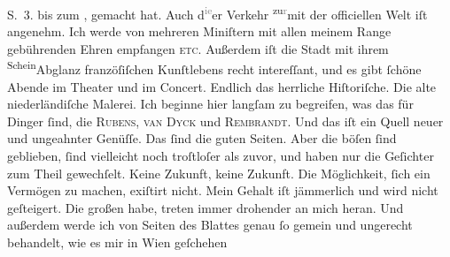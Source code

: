 \begin{ledgroupsized}[t]{13cm}
{{{                     S. 3.}}}\label{K_L02669-8h} bis zum \label{K_L02669-666v}\label{K_L02669-666h}, gemacht
               hat. Auch d\substVorne{}\textsuperscript{\textcolor{gray}{ie}}\substDazwischen{}er\substHinten{} Verkehr \substVorne{}\textsuperscript{zu\textcolor{gray}{r}}\substDazwischen{}mit der\substHinten{} officiellen Welt iſt angenehm. Ich werde von mehreren Miniſtern mit allen
               meinem Range gebührenden Ehren empfangen \textsc{etc.} Außerdem iſt
               die Stadt mit ihrem \substVorne{}\textsuperscript{Schein}{\allowbreak}\substDazwischen{}Abglanz\substHinten{} franzöſiſchen Kunſtlebens recht intereſſant, und es gibt ſchöne Abende im
               Theater und im Concert. Endlich das herrliche Hiſtoriſche. Die alte niederländiſche Malerei. Ich beginne hier langſam zu
               begreifen, was das für Dinger ſind, die \textsc{Rubens}, \textsc{van Dyck} und \textsc{Rembrandt}. Und das iſt ein Quell neuer und {\pb}ungeahnter
               Genüſſe.\pend
           \pstart
           Das ſind die guten Seiten. Aber die böſen ſind geblieben, ſind vielleicht noch
               troſtloſer als zuvor, und haben nur die Geſichter zum Theil gewechſelt. Keine
               Zukunft, keine Zukunft. Die Möglichkeit, ſich ein Vermögen zu machen, exiſtirt nicht.
               Mein Gehalt iſt jämmerlich und wird nicht geſteigert. Die großen \label{K_L02669-999v}\label{K_L02669-999h} habe, treten immer drohender an mich heran. Und außerdem werde ich von Seiten
               des Blattes genau ſo gemein und
               ungerecht behandelt, wie es mir in Wien geſchehen

\end{ledgroupsized}

